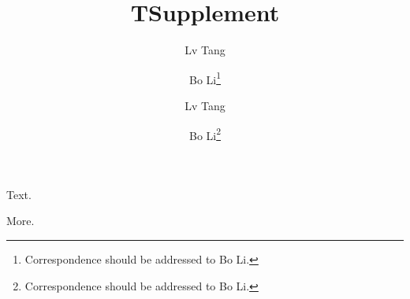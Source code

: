 \documentclass{llncs}
\begin{document}
\title{T}
\author{Lv Tang \and Bo Li\thanks{Correspondence should be addressed to Bo Li.}}
\maketitle
Text.
\clearpage
\title{Supplement}
\author{Lv Tang \and Bo Li\thanks{Correspondence should be addressed to Bo Li.}}
\maketitle
More.
\end{document}
